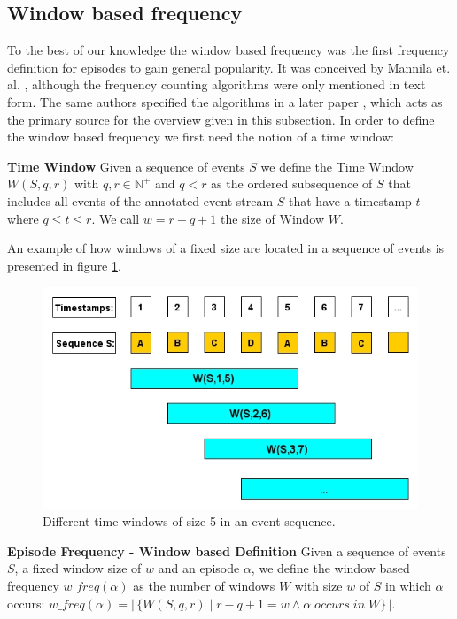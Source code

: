 \subsection{Window based frequency}
\label{subsec_windowBased}
To the best of our knowledge the window based frequency was the first frequency definition for episodes to gain general popularity. It was conceived by Mannila et. al. \cite{mannila1995discovering}, although the frequency counting algorithms were only mentioned in text form. The same authors  specified the algorithms in a later paper \cite{mannila1997discovery}, which acts as the primary source for the overview given in this subsection. In order to define the window based frequency we first need the notion of a time window: 

\begin{mydef}
\textbf{Time Window} Given a sequence of events $S$ we define the Time Window $W(S,q,r)$ with $q,r \in \mathbb{N}^+$ and $q < r$ as the ordered subsequence of $S$ that includes all events of the annotated event stream $S$ that have a timestamp $t$ where $q \leq t\leq r$. We call $w = r-q+1$ the size of Window $W$.
\end{mydef}

An example of how windows of a fixed size are located in a sequence of events is presented in figure \ref{fig_windowBasedFrequency}.

\begin{figure}[h]
	\centering
  	\includegraphics[width=\textwidth]{windowBasedFrequency}
	\caption{Different time windows of size 5 in an event sequence.}
	\label{fig_windowBasedFrequency}
\end{figure}


\begin{mydef}
\textbf{Episode Frequency - Window based Definition} Given a sequence of events $S$, a fixed window size of $w$ and an episode $\alpha$, we define the window based frequency $w\_freq(\alpha )$ as the number of windows $W$ with size $w$ of $S$ in which $\alpha$ occurs: $w\_freq(\alpha ) = |\,\{W(S,q,r) \mid r-q+1 = w \land \alpha \;occurs\; in\; W \}\,|$. %
\end{mydef}


